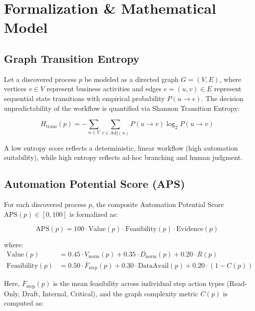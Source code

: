 \documentclass[sigconf,natbib=true]{acmart}
\begin{document}
\section{Formalization \& Mathematical Model}
\label{sec:methodology}

\subsection{Graph Transition Entropy}
Let a discovered process $p$ be modeled as a directed graph $G = (V, E)$, where vertices $v \in V$ represent business activities and edges $e = (u, v) \in E$ represent sequential state transitions with empirical probability $P(u \to v)$. The decision unpredictability of the workflow is quantified via Shannon Transition Entropy:

\begin{equation}
    H_{\text{trans}}(p) = -\sum_{u \in V} \sum_{v \in \text{Adj}(u)} P(u \to v) \log_2 P(u \to v)
\end{equation}

A low entropy score reflects a deterministic, linear workflow (high automation suitability), while high entropy reflects ad-hoc branching and human judgment.

\subsection{Automation Potential Score (APS)}
For each discovered process $p$, the composite Automation Potential Score $\text{APS}(p) \in [0, 100]$ is formalized as:

\begin{equation}
    \text{APS}(p) = 100 \cdot \text{Value}(p) \cdot \text{Feasibility}(p) \cdot \text{Evidence}(p)
\end{equation}

where:
\begin{align}
    \text{Value}(p) &= 0.45 \cdot V_{\text{norm}}(p) + 0.35 \cdot D_{\text{norm}}(p) + 0.20 \cdot R(p) \\
    \text{Feasibility}(p) &= 0.50 \cdot \bar{F}_{\text{step}}(p) + 0.30 \cdot \text{DataAvail}(p) + 0.20 \cdot (1 - C(p))
\end{align}

Here, $\bar{F}_{\text{step}}(p)$ is the mean feasibility across individual step action types (Read-Only, Draft, Internal, Critical), and the graph complexity metric $C(p)$ is computed as:
\end{document}
